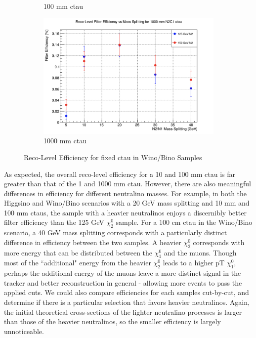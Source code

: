 \documentclass{article}
\begin{document}
\begin{figure} [H]
\begin{subfigure}{.5\textwidth}
  \caption{100 mm ctau}
  \label{fig:sub-third18}
\end{subfigure}
\begin{subfigure}{.5\textwidth}
  \centering
  \includegraphics[width=.8\linewidth]{1000mmWinoEff.png}  
  \caption{1000 mm ctau}
  \label{fig:sub-fourth18}
\end{subfigure}
\caption{Reco-Level Efficiency for fixed ctau in Wino/Bino Samples}
\label{fig:26}
\end{figure}
\par
As expected, the overall reco-level efficiency for a 10 and 100 mm ctau is far greater than that of the 1 and 1000 mm ctau. However, there are also meaningful differences in efficiency for different neutralino masses. For example, in both the Higgsino and Wino/Bino scenarios with a 20 GeV mass splitting and 10 mm and 100 mm ctaus, the sample with a heavier neutralinos enjoys a discernibly better filter efficiency than the 125 GeV $\chi_{2}^{0}$ sample. For a 100 cm ctau in the Wino/Bino scenario, a 40 GeV mass splitting corresponds with a particularly distinct difference in efficiency between the two samples. A heavier $\chi_{2}^{0}$ corresponds with more energy that can be distributed between the $\chi_{1}^{0}$ and the muons. Though most of the ``additional" energy from the heavier $\chi_{2}^{0}$ leads to a higher pT $\chi_{1}^{0}$, perhaps the additional energy of the muons leave a more distinct signal in the tracker and better reconstruction in general - allowing more events to pass the applied cuts. We could also compare efficiencies for each samples cut-by-cut, and determine if there is a particular selection that favors heavier neutralinos. Again, the initial theoretical cross-sections of the lighter neutralino processes is larger than those of the heavier neutralinos, so the smaller efficiency is largely unnoticeable.
\end{document}
